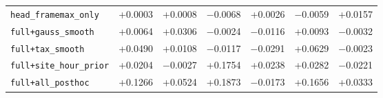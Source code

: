\begin{table}[H]
\begin{adjustbox}{max width=\linewidth}
\begin{tabular}{lrrrrrr}
\texttt{head\_framemax\_only} & +0.0003 & +0.0008 & $-$0.0068 & +0.0026 & $-$0.0059 & +0.0157 \\
\texttt{full+gauss\_smooth} & +0.0064 & +0.0306 & $-$0.0024 & $-$0.0116 & +0.0093 & $-$0.0032 \\
\texttt{full+tax\_smooth} & +0.0490 & +0.0108 & $-$0.0117 & $-$0.0291 & +0.0629 & $-$0.0023 \\
\texttt{full+site\_hour\_prior} & +0.0204 & $-$0.0027 & +0.1754 & +0.0238 & +0.0282 & $-$0.0221 \\
\texttt{full+all\_posthoc} & +0.1266 & +0.0524 & +0.1873 & $-$0.0173 & +0.1656 & +0.0333 \\
\bottomrule
\end{tabular}
\end{adjustbox}
\end{table}
